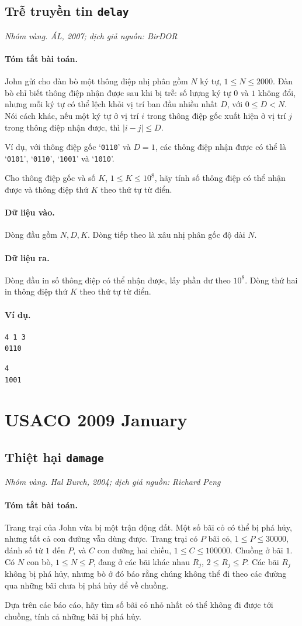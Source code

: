 \documentclass[11pt]{article}
\newcommand{\problem}[4]{%
  \subsection[#1 (#2)]{#1 \hfill {\normalsize\texttt{#2}}}%
  \noindent\textit{#3. #4}\par\smallskip
}
\newcommand{\iosec}[1]{\paragraph{#1}}
\begin{document}
\problem{Trễ truyền tin}{delay}{Nhóm vàng}{ÁL, 2007; dịch giả nguồn: BirDOR}

\iosec{Tóm tắt bài toán.}
John gửi cho đàn bò một thông điệp nhị phân gồm \(N\) ký tự,
\(1\le N\le 2000\). Đàn bò chỉ biết thông điệp nhận được sau khi bị trễ: số
lượng ký tự \(0\) và \(1\) không đổi, nhưng mỗi ký tự có thể lệch khỏi vị trí
ban đầu nhiều nhất \(D\), với \(0\le D<N\). Nói cách khác, nếu một ký tự ở vị
trí \(i\) trong thông điệp gốc xuất hiện ở vị trí \(j\) trong thông điệp
nhận được, thì \(|i-j|\le D\).

Ví dụ, với thông điệp gốc `\texttt{0110}' và \(D=1\), các thông điệp nhận
được có thể là `\texttt{0101}', `\texttt{0110}', `\texttt{1001}' và
`\texttt{1010}'.

Cho thông điệp gốc và số \(K\), \(1\le K\le 10^8\), hãy tính số thông điệp
có thể nhận được và thông điệp thứ \(K\) theo thứ tự từ điển.

\iosec{Dữ liệu vào.}
Dòng đầu gồm \(N,D,K\). Dòng tiếp theo là xâu nhị phân gốc độ dài \(N\).

\iosec{Dữ liệu ra.}
Dòng đầu in số thông điệp có thể nhận được, lấy phần dư theo \(10^8\). Dòng
thứ hai in thông điệp thứ \(K\) theo thứ tự từ điển.

\iosec{Ví dụ.}
\begin{verbatim}
4 1 3
0110
\end{verbatim}

\begin{verbatim}
4
1001
\end{verbatim}

\section{USACO 2009 January}

\problem{Thiệt hại}{damage}{Nhóm vàng}{Hal Burch, 2004; dịch giả nguồn: Richard Peng}

\iosec{Tóm tắt bài toán.}
Trang trại của John vừa bị một trận động đất. Một số bãi cỏ có thể bị phá
hủy, nhưng tất cả con đường vẫn dùng được. Trang trại có \(P\) bãi cỏ,
\(1\le P\le 30000\), đánh số từ \(1\) đến \(P\), và \(C\) con đường hai
chiều, \(1\le C\le 100000\). Chuồng ở bãi \(1\). Có \(N\) con bò,
\(1\le N\le P\), đang ở các bãi khác nhau \(R_j\), \(2\le R_j\le P\). Các
bãi \(R_j\) không bị phá hủy, nhưng bò ở đó báo rằng chúng không thể đi theo
các đường qua những bãi chưa bị phá hủy để về chuồng.

Dựa trên các báo cáo, hãy tìm số bãi cỏ nhỏ nhất có thể không đi được tới
chuồng, tính cả những bãi bị phá hủy.
\end{document}
